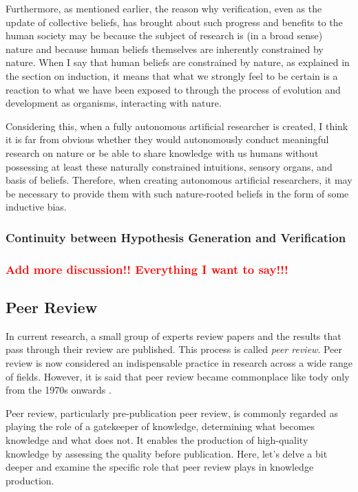 \documentclass{book}
\begin{document}
Furthermore, as mentioned earlier, the reason why verification, even as the update of collective beliefs, has brought about such progress and benefits to the human society may be because the subject of research is (in a broad sense) nature and because human beliefs themselves are inherently constrained by nature. When I say that human beliefs are constrained by nature, as explained in the section on induction, it means that what we strongly feel to be certain is a reaction to what we have been exposed to through the process of evolution and development as organisms, interacting with nature.

Considering this, when a fully autonomous artificial researcher is created, I think it is far from obvious whether they would autonomously conduct meaningful research on nature or be able to share knowledge with us humans without possessing at least these naturally constrained intuitions, sensory organs, and basis of beliefs. Therefore, when creating autonomous artificial researchers, it may be necessary to provide them with such nature-rooted beliefs in the form of some inductive bias.

\subsubsection{Continuity between Hypothesis Generation and Verification}

\subsubsection{\textcolor{red}{Add more discussion!! Everything I want to say!!!}}

\subsection{Peer Review}
In current research, a small group of experts review papers and the results that pass through their review are published. This process is called \textit{peer review}. Peer review is now considered an indispensable practice in research across a wide range of fields. However, it is said that peer review became commonplace like tody only from the 1970s onwards \cite{baldwin2018scientific}.

Peer review, particularly pre-publication peer review, is commonly regarded as playing the role of a gatekeeper of knowledge, determining what becomes knowledge and what does not. It enables the production of high-quality knowledge by assessing the quality before publication. Here, let's delve a bit deeper and examine the specific role that peer review plays in knowledge production.
\end{document}

